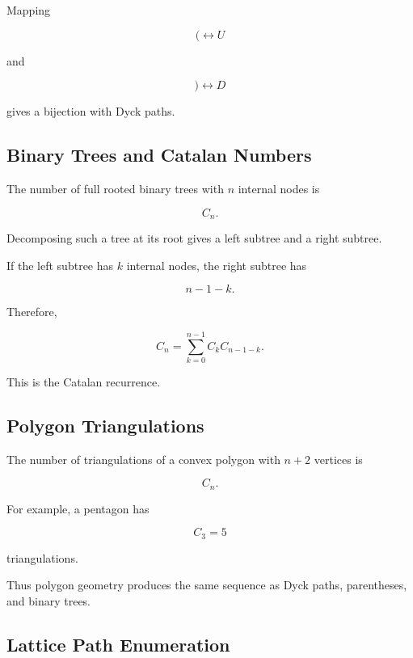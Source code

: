 Mapping

\[
(
\longleftrightarrow U
\]

and

\[
)
\longleftrightarrow D
\]

gives a bijection with Dyck paths.

\subsection{Binary Trees and Catalan Numbers}
\label{subsec:binary-trees-catalan}

The number of full rooted binary trees with \(n\) internal nodes is

\[
\boxed{
C_n.
}
\]

Decomposing such a tree at its root gives a left subtree and a right
subtree.

If the left subtree has \(k\) internal nodes, the right subtree has

\[
n-1-k.
\]

Therefore,

\[
C_n
=
\sum_{k=0}^{n-1}
C_kC_{n-1-k}.
\]

This is the Catalan recurrence.

\subsection{Polygon Triangulations}
\label{subsec:polygon-triangulations}

The number of triangulations of a convex polygon with \(n+2\) vertices
is

\[
\boxed{
C_n.
}
\]

For example, a pentagon has

\[
C_3=5
\]

triangulations.

Thus polygon geometry produces the same sequence as Dyck paths,
parentheses, and binary trees.

\subsection{Lattice Path Enumeration}
\label{subsec:lattice-path-enumeration}

